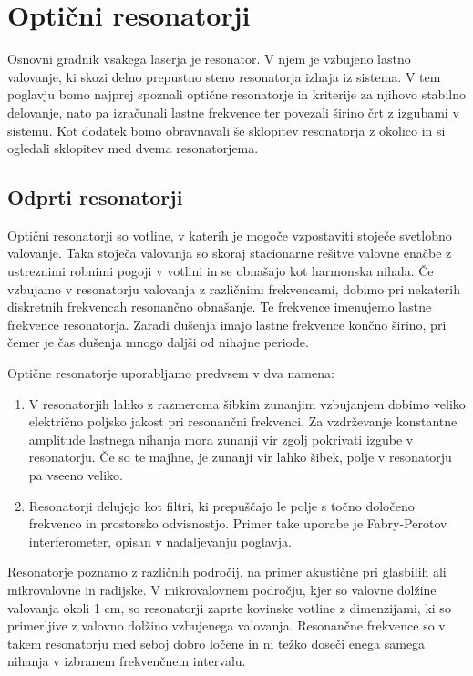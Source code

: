 
\chapter{Optični resonatorji}
Osnovni gradnik vsakega laserja je resonator. V njem je vzbujeno lastno valovanje,
ki skozi delno prepustno steno resonatorja izhaja iz sistema. V tem poglavju bomo 
najprej spoznali optične resonatorje in kriterije za njihovo stabilno delovanje,
nato pa izračunali lastne frekvence ter povezali širino črt z izgubami v sistemu. 
Kot dodatek bomo obravnavali še sklopitev resonatorja z okolico in si ogledali 
sklopitev med dvema resonatorjema.

\section{Odprti resonatorji}
Optični resonatorji so votline, v katerih je mogoče 
vzpostaviti stoječe svetlobno valovanje. Taka stoječa valovanja so skoraj 
stacionarne rešitve valovne enačbe z ustreznimi robnimi pogoji v votlini 
in se obnašajo kot harmonska nihala. Če vzbujamo v resonatorju valovanja z 
različnimi frekvencami, dobimo pri nekaterih diskretnih frekvencah resonančno
obnašanje. Te frekvence imenujemo lastne frekvence
resonatorja. Zaradi dušenja imajo lastne frekvence končno širino, pri čemer
je čas dušenja mnogo daljši od nihajne periode. 

Optične resonatorje uporabljamo predvsem v dva namena:
\begin{enumerate}
\item V resonatorjih lahko z razmeroma šibkim zunanjim vzbujanjem dobimo veliko
električno poljsko jakost pri resonančni frekvenci. Za vzdrževanje
konstantne amplitude lastnega nihanja mora zunanji vir zgolj pokrivati izgube
v resonatorju. Če so te majhne, je zunanji vir lahko šibek, polje
v resonatorju pa vseeno veliko.\\
\item Resonatorji delujejo kot filtri, ki prepuščajo le polje s točno  
določeno frekvenco in prostorsko odvisnostjo. Primer take uporabe je 
Fabry-Perotov interferometer, opisan 
v nadaljevanju poglavja. 
\end{enumerate}

Resonatorje poznamo z različnih področij, na primer akustične pri glasbilih ali 
mikrovalovne in radijske. V mikrovalovnem področju, kjer so valovne dolžine valovanja
okoli 1 cm, so resonatorji zaprte kovinske votline z dimenzijami, ki so primerljive z 
valovno dolžino vzbujenega valovanja. Resonančne frekvence so v takem resonatorju 
med seboj dobro ločene in ni težko doseči enega samega nihanja v izbranem 
frekvenčnem intervalu.

